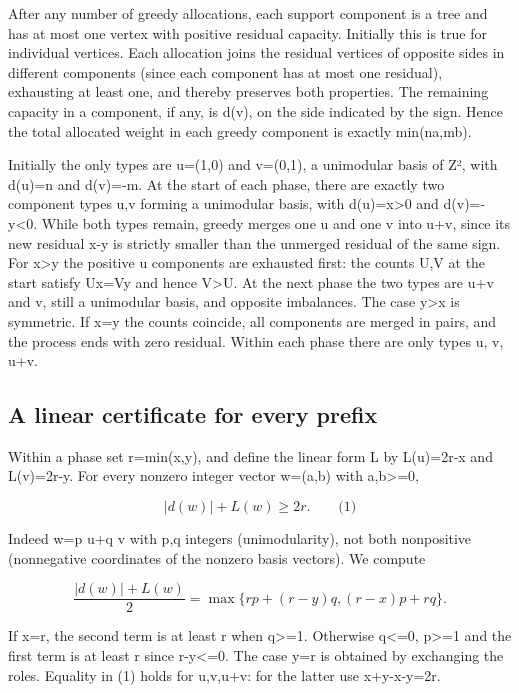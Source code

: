 \documentclass[11pt]{article}
\begin{document}
After any number of greedy allocations, each support component is a tree and has at most one vertex with positive residual capacity. Initially this is true for individual vertices. Each allocation joins the residual vertices of opposite sides in different components (since each component has at most one residual), exhausting at least one, and thereby preserves both properties. The remaining capacity in a component, if any, is \textbar d(v)\textbar, on the side indicated by the sign. Hence the total allocated weight in each greedy component is exactly min(na,mb).

Initially the only types are u=(1,0) and v=(0,1), a unimodular basis of Z², with d(u)=n and d(v)=-m. At the start of each phase, there are exactly two component types u,v forming a unimodular basis, with d(u)=x\textgreater0 and d(v)=-y\textless0. While both types remain, greedy merges one u and one v into u+v, since its new residual \textbar x-y\textbar{} is strictly smaller than the unmerged residual of the same sign. For x\textgreater y the positive u components are exhausted first: the counts U,V at the start satisfy Ux=Vy and hence V\textgreater U. At the next phase the two types are u+v and v, still a unimodular basis, and opposite imbalances. The case y\textgreater x is symmetric. If x=y the counts coincide, all components are merged in pairs, and the process ends with zero residual. Within each phase there are only types u, v, u+v.

\subsection{A linear certificate for every prefix}\label{a-linear-certificate-for-every-prefix}

Within a phase set r=min(x,y), and define the linear form L by L(u)=2r-x and L(v)=2r-y. For every nonzero integer vector w=(a,b) with a,b\textgreater=0,

\[|d(w)|+L(w)\ge 2r. \qquad\text{(1)}\]

Indeed w=p u+q v with p,q integers (unimodularity), not both nonpositive (nonnegative coordinates of the nonzero basis vectors). We compute

\[\frac{|d(w)|+L(w)}2=\max\{rp+(r-y)q,(r-x)p+rq\}.\]

If x=r, the second term is at least r when q\textgreater=1. Otherwise q\textless=0, p\textgreater=1 and the first term is at least r since r-y\textless=0. The case y=r is obtained by exchanging the roles. Equality in (1) holds for u,v,u+v: for the latter use x+y-\textbar x-y\textbar=2r.
\end{document}

